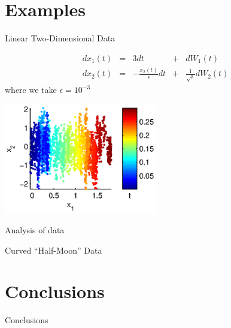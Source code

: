 \documentclass[12pt]{beamer}
\begin{document}
\section{Examples}

\begin{frame}{Linear Two-Dimensional Data}

\begin{equation*} 
\begin{aligned}
dx_1(t) &=& 3dt &+& dW_1(t)\\
dx_2(t) &=& -\frac{x_2(t)}{\epsilon} dt &+& \frac{1}{\sqrt{\epsilon}} dW_2(t)
\end{aligned}
\end{equation*} 
where we take $\epsilon = 10^{-3}$

\includegraphics[width=0.5\textwidth]{data_init}
\end{frame}

\begin{frame}{Analysis of data}

\end{frame}

\begin{frame}{Curved ``Half-Moon'' Data}

\end{frame}

\section{Conclusions}

\begin{frame}{Conclusions}

\end{frame}
\end{document}
